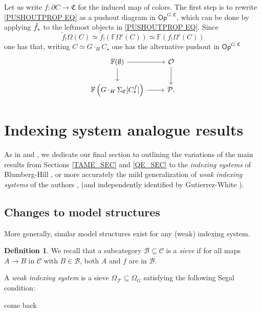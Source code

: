 \documentclass[a4paper,10pt
,draft
]{article}%
\numberwithin{equation}{section}
\numberwithin{figure}{section}
\theoremstyle{definition} %
\newtheorem{definition}[equation]{Definition}%
\newcommand{\F}{\ensuremath{\mathcal F}}
\newcommand{\1}{\ensuremath{\mathbbm 1}}%
\begin{document}
Let us write $f \colon \partial C \to \mathfrak{C}$
for the induced map of colors.
The first step is to rewrite \eqref{PUSHOUTPROP EQ} as a pushout diagram in $\mathsf{Op}^{G,\mathfrak{C}}$, which can be done by applying $\check{f}_{\**}$
to the leftmost objects in \eqref{PUSHOUTPROP EQ}.
Since
\[
\check{f}_{!} \Omega(C) \simeq 
\check{f}_{!} \left( \mathbb{F} \Omega'(C) \right) \simeq 
\mathbb{F} \left(f_{!}  \Omega'(C) \right)
\]
one has that, writing $C \simeq G \cdot_H C_{\star}$ one has the alternative pushout in $\mathsf{Op}^{G,\mathfrak{C}}$
\begin{equation}
\begin{tikzcd}
\mathbb{F} ( \emptyset ) \ar{r} \ar{d} & \mathcal{O} \ar{d}
\\
\mathbb{F} \left( 
G \cdot_H \Sigma_{\mathfrak{C}}[C^f_{\star}] \right) \ar{r} & \mathcal{P}.
\end{tikzcd}
\end{equation}










\section{Indexing system analogue results}\label{INDSYS SEC}

As in \cite[\S 6]{BP_edss} and \cite[\S 9]{Per18}, we dedicate our final section to 
outlining the variations of the main results from Sections \ref{TAME_SEC} and \ref{QE_SEC} to
the \textit{indexing systems} of Blumberg-Hill \cite{BH15}, or more accurately
the mild generalization of \textit{weak indexing systems} of the authors \cite[\S 9]{Per18}, \cite[\S4.4]{BP_geo} (and independently identified by Gutierrez-White \cite{GW18}).


\subsection{Changes to model structures}
More generally, similar model structures exist for any (weak) indexing system.
\begin{definition}
      We recall that a subcategory $\mathcal B \subseteq \mathcal C$ is a \textit{sieve} if for all maps $A \to B$ in $\mathcal C$
      with $B \in \mathcal B$, both $A$ and $f$ are in $\mathcal B$.

      A \textit{weak indexing system} is a sieve
      $\Omega_\F \subseteq \Omega_G$
      satisfying the following Segal condition:

      come back
\end{definition}
\end{document}
